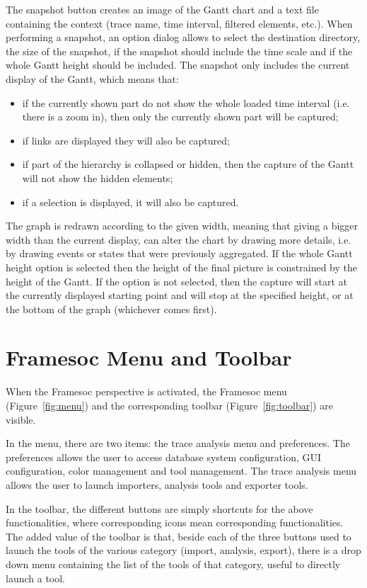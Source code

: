 \documentclass[twoside]{article}
\begin{document}
\begin{sloppypar}
The snapshot button creates an image of the Gantt chart and a text file containing the context (trace name, time interval, filtered elements, etc.).
When performing a snapshot, an option dialog allows to select the destination directory, the size of the snapshot, if the snapshot should include the time scale and if the whole Gantt height should be included.
The snapshot only includes the current display of the Gantt, which means that:
\begin{itemize}
	\item if the currently shown part do not show the whole loaded time interval (i.e. there is a zoom in), then only the currently shown part will be captured;
	\item if links are displayed they will also be captured;
	\item if part of the hierarchy is collapsed or hidden, then the capture of the Gantt will not show the hidden elements;
	\item if a selection is displayed, it will also be captured.
\end{itemize}

The graph is redrawn according to the given width, meaning that giving a bigger width than the current display, can alter the chart by drawing more details, i.e. by drawing events or states that were previously aggregated.
If the whole Gantt height option is selected then the height of the final picture is constrained by the height of the Gantt. 
If the option is not selected, then the capture will start at the currently displayed starting point and will stop at the specified height, or at the bottom of the graph (whichever comes first).

\section{Framesoc Menu and Toolbar}
\label{sec:menu}

When the Framesoc perspective is activated, the Framesoc menu (Figure~\ref{fig:menu}) and the corresponding toolbar (Figure~\ref{fig:toolbar}) are visible. 

In the menu, there are two items: the trace analysis menu and preferences.
The preferences allows the user to access database system configuration, GUI configuration, color management and tool management.
The trace analysis menu allows the user to launch importers, analysis tools and exporter tools.

In the toolbar, the different buttons are simply shortcuts for the above functionalities, where corresponding icons mean corresponding functionalities.
The added value of the toolbar is that, beside each of the three buttons used to launch the tools of the various category (import, analysis, export), there is a drop down menu containing the list of the tools of that category, useful to directly launch a tool.


\end{sloppypar}
\end{document}
